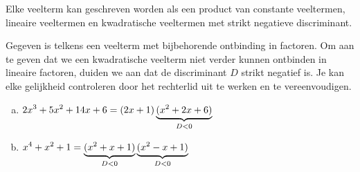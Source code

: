 \documentclass{ximera}
\begin{document}
	\begin{theorem} 
	Elke veelterm kan geschreven worden als een product van constante veeltermen, lineaire veel\-termen en kwadratische veeltermen met strikt negatieve discriminant.
	\end{theorem} 
	
	\begin{example} 
	Gegeven is telkens een veelterm met bijbehorende ontbinding in factoren. Om aan te geven dat we een kwadratische veelterm niet verder kunnen ontbinden in lineaire factoren, duiden we aan dat de discriminant $D$ strikt negatief is. Je kan elke gelijkheid controleren door het rechterlid uit te werken en te vereenvoudigen. 
	\begin{enumerate}[(a)]
	\item
	$\displaystyle 2x^3 + 5x^2 + 14x + 6 = (2x+1)\underbrace{(x^2+2x+6)}_{D < 0}$
	\item
	$\displaystyle x^4+x^2+1 = \underbrace{(x^2+x+1)}_{D < 0}\underbrace{(x^2-x+1)}_{D < 0}$
	\end{enumerate}
	\end{example} 
	
	
	
\end{document}
